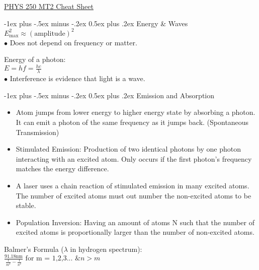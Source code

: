 \documentclass[12pt,landscape]{article}
\makeatletter
\renewcommand{\section}{\@startsection{section}{1}{0mm}%
	{-1ex plus -.5ex minus -.2ex}%
	{0.5ex plus .2ex}%
	{\normalfont\large\bfseries}}
\newcommand{\tab}{\hspace{.02\textwidth}}
\newcommand{\ds}{\displaystyle}
\makeatother
\begin{document}
\raggedright
\footnotesize
\begin{multicols}{3}
	\setlength{\premulticols}{1pt}
	\setlength{\postmulticols}{1pt}
	\setlength{\multicolsep}{1pt}
	\setlength{\columnsep}{2pt}
	
	\begin{center}
		\Large{\underline{PHYS 250 MT2 Cheat Sheet}}
	\end{center}
	
	\section{Energy \& Waves}
	\tab $E_{\text{max}}^2 \approx (\text{amplitude})^2$\\
		$\bullet$ Does not depend on frequency or matter.
	
	Energy of a photon:\\
	\tab $\ds E = hf = \frac{hc}{\lambda} $\\
		$\bullet$ Interference is evidence that light is a wave.
	
	\section{Emission and Absorption}
	\begin{itemize}[leftmargin=0.5cm]
		\itemsep0em
		\item Atom jumps from lower energy to higher energy state by absorbing a photon. It can emit a photon of the same frequency as it jumps back. (Spontaneous Transmission)
		\item Stimulated Emission: Production of two identical photons by one photon interacting with an excited atom. Only occurs if the first photon's frequency matches the energy difference.
		\item A laser uses a chain reaction of stimulated emission in many excited atoms. The number of excited atoms must out number the non-excited atoms to be stable.
		\item Population Inversion: Having an amount of atoms N such that the number of excited atoms is proportionally larger than the number of non-excited atoms.
	\end{itemize}
	
	Balmer's Formula ($\lambda$ in hydrogen spectrum):\\
	\tab $\ds \frac{91.18\text{nm}}{\frac{1}{m^2} - \frac{1}{n^2}} \text{ for m = 1,2,3... \& } n > m$
	

\end{multicols}
\end{document}
